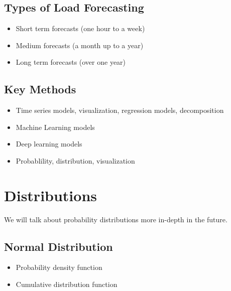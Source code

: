 \documentclass[12pt, a4paper]{report}
\begin{document}
  \subsection{Types of Load Forecasting}

  \begin{itemize}
    \item Short term forecasts (one hour to a week)
    \item Medium forecasts (a month up to a year)
    \item Long term forecasts (over one year)
  \end{itemize}

  \subsection{Key Methods}

  \begin{itemize}
    \item Time series models, visualization, regression models, decomposition
    \item Machine Learning models
    \item Deep learning models
    \item Probablility, distribution, visualization
  \end{itemize}

  \section{Distributions}

  We will talk about probability distributions more in-depth in the future.

  \subsection{Normal Distribution}

  \begin{itemize}
    \item Probability density function
    \item Cumulative distribution function
  \end{itemize}
\end{document}
